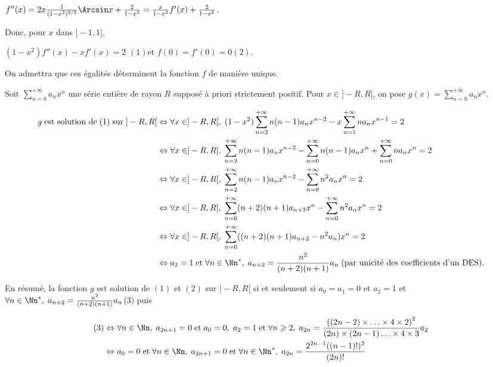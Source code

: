 {{\begin{center}
$f''(x) =2x\frac{1}{(1-x^2)^{3/2}}\Arcsin x+\frac{2}{1-x^2}=\frac{x}{1-x^2}f'(x)+\frac{2}{1-x^2}$.
\end{center}

Donc, pour $x$ dans $]-1,1[$,

\begin{center}
$(1-x^2)f''(x)-xf'(x)=2$ \quad$(1)$\quad et $f(0)=f'(0) = 0$\quad$(2)$.
\end{center}

On admettra que ces égalités déterminent la fonction $f$ de manière unique.

Soit $\sum_{n=0}^{+\infty}a_nx^n$ une série entière de rayon $R$ supposé à priori strictement positif. Pour $x\in]-R,R[$, on pose $g(x)=\sum_{n=0}^{+\infty}a_nx^n$.

\begin{align*}\ensuremath
g\;\text{est solution de}\;(1)\;\text{sur}\;]-R,R[&\Leftrightarrow\forall x\in]-R,R[,\;(1-x^2)  \sum_{n=2}^{+\infty}n(n-1)a_nx^{n-2} -x\sum_{n=1}^{+\infty}na_nx^{n-1}=2\\
 &\Leftrightarrow \forall x\in]-R,R[,\;\sum_{n=2}^{+\infty}n(n-1)a_nx^{n-2}-\sum_{n=0}^{+\infty}n(n-1)a_nx^n+\sum_{n=0}^{+\infty}na_nx^n= 2\\
 &\Leftrightarrow \forall x\in]-R,R[,\;\sum_{n=2}^{+\infty}n(n-1)a_nx^{n-2}-\sum_{n=0}^{+\infty}n^2a_nx^n = 2\\
 &\Leftrightarrow \forall x\in]-R,R[,\;\sum_{n=0}^{+\infty}(n+2)(n+1)a_{n+2}x^{n}-\sum_{n=0}^{+\infty}n^2a_nx^n = 2\\
 &\Leftrightarrow\forall x\in]-R,R[,\;\sum_{n=0}^{+\infty}((n+2)(n+1)a_{n+2}-n^2a_n)x^{n}= 2\\
 &\Leftrightarrow a_2=1\;\text{et}\;\forall n\in\Nn^*,\;a_{n+2}=\frac{n^2}{(n+2)(n+1)}a_n\;(\text{par unicité des coefficients d'un DES}).
\end{align*}

En résumé, la fonction $g$ est solution de $(1)$ et $(2)$ sur $]-R,R[$ si et seulement si $a_0=a_1=0$ et $a_2=1$ et $\forall n\in\Nn^*,\;a_{n+2}=\frac{n^2}{(n+2)(n+1)}a_n$\quad(3) puis

\begin{align*}\ensuremath
(3)&\Leftrightarrow\forall n\in\Nn,\; a_{2n+1}= 0\;\text{et}\;a_0=0,\;a_2 =1\;\text{et}\;\forall n\geqslant2,\;a_{2n}= \frac{\left((2n-2)\times\ldots\times4\times2\right)^2}{(2n)\times(2n-1)\ldots\times4\times3}a_2\\
 &\Leftrightarrow a_0 = 0\;\text{et}\;\forall n\in\Nn,\;a_{2n+1}= 0\;\text{et}\;\forall n\in\Nn^*,\;a_{2n}=\frac{2^{2n-1}((n-1)!)^2}{(2n)!}
\end{align*}

}}

